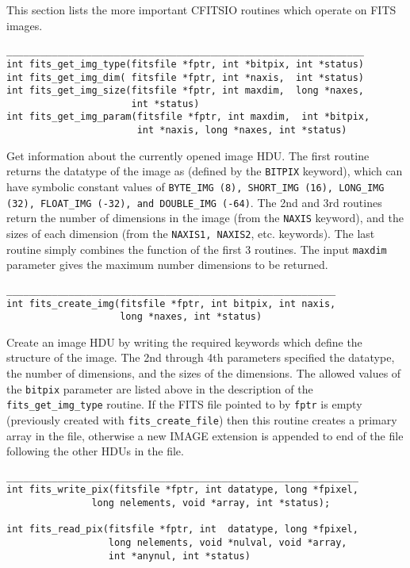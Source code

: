\documentclass[11pt]{article}
\begin{document}
This section lists the more important CFITSIO routines which operate on
FITS images.

\begin{verbatim}
_______________________________________________________________
int fits_get_img_type(fitsfile *fptr, int *bitpix, int *status)
int fits_get_img_dim( fitsfile *fptr, int *naxis,  int *status)
int fits_get_img_size(fitsfile *fptr, int maxdim,  long *naxes,
                      int *status)
int fits_get_img_param(fitsfile *fptr, int maxdim,  int *bitpix,
                       int *naxis, long *naxes, int *status)
\end{verbatim}

Get information about the currently opened image HDU. The first routine
returns the datatype of the image as (defined by the {\tt BITPIX}
keyword), which can have symbolic constant values of {\tt BYTE\_IMG
(8), SHORT\_IMG (16), LONG\_IMG (32), FLOAT\_IMG (-32), and DOUBLE\_IMG
(-64)}.  The 2nd and 3rd routines return the number of dimensions in
the image (from the {\tt NAXIS} keyword), and the sizes of each
dimension (from the {\tt NAXIS1, NAXIS2}, etc. keywords).  The last
routine simply combines the function of the first 3 routines.  The
input {\tt maxdim} parameter gives the maximum number dimensions to be
returned.
  
\begin{verbatim}
__________________________________________________________
int fits_create_img(fitsfile *fptr, int bitpix, int naxis, 
                    long *naxes, int *status)
\end{verbatim}

Create an image HDU by writing the required keywords which define the
structure of the image.  The 2nd through 4th parameters  specified the
datatype, the number of dimensions, and the sizes of the dimensions.
The allowed values of the {\tt bitpix} parameter are listed above in
the description of the {\tt fits\_get\_img\_type} routine.  If the FITS
file pointed to by {\tt fptr} is empty (previously created with
{\tt fits\_create\_file}) then this routine creates a primary array in
the file, otherwise a new IMAGE extension is appended to end of the
file following the other HDUs in the file.

\begin{verbatim}
______________________________________________________________
int fits_write_pix(fitsfile *fptr, int datatype, long *fpixel,
               long nelements, void *array, int *status);

int fits_read_pix(fitsfile *fptr, int  datatype, long *fpixel, 
                  long nelements, void *nulval, void *array, 
                  int *anynul, int *status)
\end{verbatim}
\end{document}
